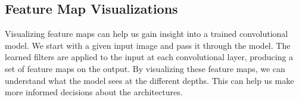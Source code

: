 
%

\subsection{Feature Map Visualizations}
Visualizing feature maps can help us gain insight into a trained convolutional model. We start with a given input image and pass it through the model. The learned filters are applied to the input at each convolutional layer, producing a set of feature maps on the output. By visualizing these feature maps, we can understand what the model sees at the different depths. This can help us make more informed decisions about the architectures.

%

